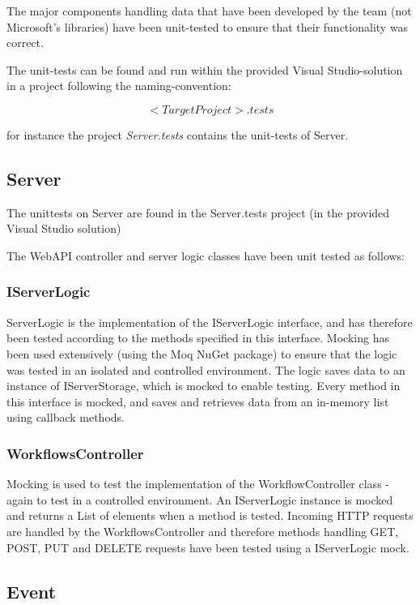 The major components handling data that have been developed by the team
(not Microsoft's libraries) have been unit-tested to ensure that their
functionality was correct.

The unit-tests can be found and run within the provided Visual
Studio-solution in a project following the naming-convention:

\[<TargetProject>.tests\]

for instance the project \emph{Server.tests} contains the unit-tests of
Server.

\subsection{Server}\label{server}

The unittests on Server are found in the Server.tests project (in the
provided Visual Studio solution)

The WebAPI controller and server logic classes have been unit tested as
follows:

\subsubsection{IServerLogic}\label{iserverlogic}

ServerLogic is the implementation of the IServerLogic interface, and has
therefore been tested according to the methods specified in this
interface. Mocking has been used extensively (using the Moq NuGet
package) to ensure that the logic was tested in an isolated and
controlled environment. The logic saves data to an instance of
IServerStorage, which is mocked to enable testing. Every method in this
interface is mocked, and saves and retrieves data from an in-memory list
using callback methods.

\subsubsection{WorkflowsController}\label{workflowscontroller}

Mocking is used to test the implementation of the WorkflowController
class - again to test in a controlled environment. An IServerLogic
instance is mocked and returns a List of elements when a method is
tested. Incoming HTTP requests are handled by the WorkflowsController
and therefore methods handling GET, POST, PUT and DELETE requests have
been tested using a IServerLogic mock.

\subsection{Event}\label{event-1}

